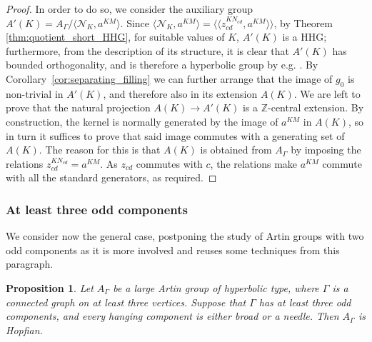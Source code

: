 \documentclass[svgnames]{amsart}
\theoremstyle{plain}
\newtheorem{prop}[thm]{Proposition}
\theoremstyle{definition}
\newcommand{\Z}{\mathbb{Z}}
\begin{document}
\begin{proof}
In order to do so, we consider the auxiliary group $A'(K)=A_\Gamma/\langle\mathcal N_K, a^{KM}\rangle$. Since $\langle\mathcal N_K, a^{KM}\rangle=\langle\langle z_{cd}^{KN_{cd}}, a^{KM} \rangle\rangle$, by Theorem \ref{thm:quotient_short_HHG}, for suitable values of $K$, $A'(K)$ is a HHG; furthermore, from the description of its structure, it is clear that $A'(K)$ has bounded orthogonality, and is therefore a hyperbolic group by e.g. \cite[Corollary 2.14]{quasiflats}. By Corollary~\ref{cor:separating_filling} we can further arrange that the image of $g_0$ is non-trivial in $A'(K)$, and therefore also in its extension $A(K)$. We are left to prove that the natural projection $A(K)\to A'(K)$ is a $\Z$-central extension. By construction, the kernel is normally generated by the image of $a^{KM}$ in $A(K)$, so in turn it suffices to prove that said image commutes with a generating set of $A(K)$. The reason for this is that $A(K)$ is obtained from $A_\Gamma$ by imposing the relations $z_{cd}^{KN_{cd}}=a^{KM}$. As $z_{cd}$ commutes with $c$, the relations make $a^{KM}$ commute with all the standard generators, as required.
\end{proof}







\subsubsection{At least three odd components}
We consider now the general case, postponing the study of Artin groups with two odd components as it is more involved and reuses some techniques from this paragraph.

\begin{prop}\label{prop:3+_odd}
    Let $A_\Gamma$ be a large Artin group of hyperbolic type, where $\Gamma$ is a connected graph on at least three vertices. Suppose that $\Gamma$ has at least three odd components, and every hanging component is either broad or a needle. Then $A_\Gamma$ is Hopfian.
\end{prop}
\end{document}
